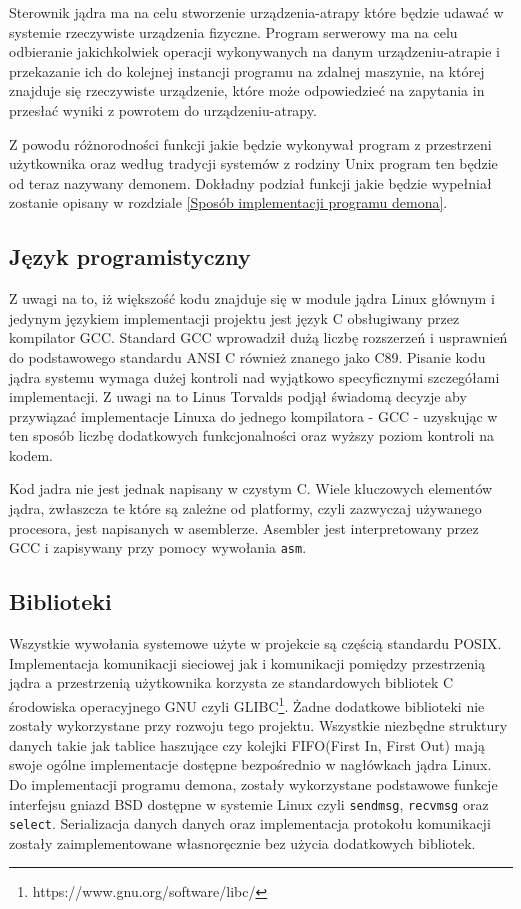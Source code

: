 \documentclass[10pt]{article}
\begin{document}
Sterownik jądra ma na celu stworzenie urządzenia-atrapy które będzie udawać w systemie rzeczywiste urządzenia fizyczne. Program serwerowy ma na celu odbieranie jakichkolwiek operacji wykonywanych na danym urządzeniu-atrapie i przekazanie ich do kolejnej instancji programu na zdalnej maszynie, na której znajduje się rzeczywiste urządzenie, które może odpowiedzieć na zapytania in przesłać wyniki z powrotem do urządzeniu-atrapy.

Z powodu różnorodności funkcji jakie będzie wykonywał program z przestrzeni użytkownika oraz według tradycji systemów z rodziny Unix program ten będzie od teraz nazywany demonem. Dokładny podział funkcji jakie będzie wypełniał zostanie opisany w rozdziale \ref{Sposób implementacji programu demona}.

\subsection{Język programistyczny}
\label{language}

Z uwagi na to, iż większość kodu znajduje się w module jądra Linux głównym i jedynym językiem implementacji projektu jest język C obsługiwany przez kompilator GCC. Standard GCC wprowadził dużą liczbę rozszerzeń i usprawnień do podstawowego standardu ANSI C również znanego jako C89. Pisanie kodu jądra systemu wymaga dużej kontroli nad wyjątkowo specyficznymi szczegółami implementacji. Z uwagi na to Linus Torvalds podjął świadomą decyzje aby przywiązać implementacje Linuxa do jednego kompilatora - GCC - uzyskując w ten sposób liczbę dodatkowych funkcjonalności\cite{gccextensions} oraz wyższy poziom kontroli na kodem.

Kod jadra nie jest jednak napisany w czystym C. Wiele kluczowych elementów jądra, zwłaszcza te które są zależne od platformy, czyli zazwyczaj używanego procesora, jest napisanych w asemblerze. Asembler jest interpretowany przez GCC i zapisywany przy pomocy wywołania \texttt{asm}\cite{asm}.

\subsection{Biblioteki}
\label{libraries}

Wszystkie wywołania systemowe użyte w projekcie są częścią standardu POSIX. Implementacja komunikacji sieciowej jak i komunikacji pomiędzy przestrzenią jądra a przestrzenią użytkownika korzysta ze standardowych bibliotek C środowiska operacyjnego GNU czyli GLIBC\footnote{https://www.gnu.org/software/libc/}. Żadne dodatkowe biblioteki nie zostały wykorzystane przy rozwoju tego projektu.  Wszystkie niezbędne struktury danych takie jak tablice haszujące czy kolejki FIFO(First In, First Out) mają swoje ogólne implementacje dostępne bezpośrednio w nagłówkach jądra Linux. Do implementacji programu demona, zostały wykorzystane podstawowe funkcje interfejsu gniazd BSD dostępne w systemie Linux czyli \texttt{sendmsg}, \texttt{recvmsg} oraz \texttt{select}. Serializacja danych danych oraz implementacja protokołu komunikacji zostały zaimplementowane własnoręcznie bez użycia dodatkowych bibliotek.
\end{document}
